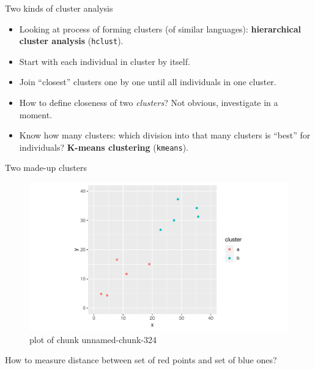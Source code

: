 \documentclass[ignorenonframetext,]{beamer}
\begin{document}
\begin{frame}[fragile]{Two kinds of cluster analysis}
\protect\hypertarget{two-kinds-of-cluster-analysis}{}

\begin{itemize}
\item
  Looking at process of forming clusters (of similar languages):
  \textbf{hierarchical cluster analysis} (\texttt{hclust}).
\item
  Start with each individual in cluster by itself.
\item
  Join ``closest'' clusters one by one until all individuals in one
  cluster.
\item
  How to define closeness of two \emph{clusters}? Not obvious,
  investigate in a moment.
\item
  Know how many clusters: which division into that many clusters is
  ``best'' for individuals? \textbf{K-means clustering}
  (\texttt{kmeans}).
\end{itemize}

\end{frame}

\begin{frame}{Two made-up clusters}
\protect\hypertarget{two-made-up-clusters}{}

\begin{figure}
\centering
\includegraphics{figure/unnamed-chunk-324-1.pdf}
\caption{plot of chunk unnamed-chunk-324}
\end{figure}

How to measure distance between set of red points and set of blue ones?

\end{frame}
\end{document}
